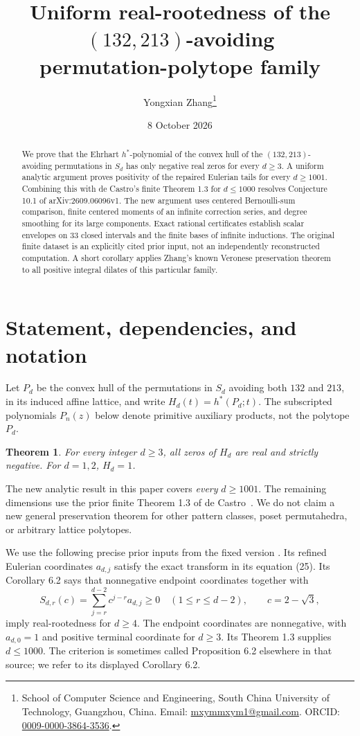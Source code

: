 \documentclass[11pt]{article}
\title{Uniform real-rootedness of the $(132,213)$-avoiding\\permutation-polytope family}
\author{Yongxian Zhang\thanks{School of Computer Science and Engineering,
South China University of Technology, Guangzhou, China.
Email: \href{mailto:mxymmxym1@gmail.com}{mxymmxym1@gmail.com}.
ORCID: \href{https://orcid.org/0009-0000-3864-3536}{0009-0000-3864-3536}.}}
\date{8 October 2026}
\newtheorem{theorem}{Theorem}[section]
\theoremstyle{remark}\newtheorem{remark}[theorem]{Remark}
\newcommand{\cc}{2-\sqrt3}
\begin{document}
\maketitle
\begin{abstract}
We prove that the Ehrhart $h^*$-polynomial of the convex hull of the
$(132,213)$-avoiding permutations in $S_d$ has only negative real zeros for
every $d\ge3$. A uniform analytic argument proves positivity of the repaired
Eulerian tails for every $d\ge1001$. Combining this with de Castro's finite
Theorem 1.3 for $d\le1000$ resolves Conjecture 10.1 of
arXiv:2609.06096v1. The new argument uses centered Bernoulli-sum comparison,
finite centered moments of an infinite correction series, and degree smoothing
for its large components. Exact rational certificates establish scalar
envelopes on 33 closed intervals and the finite bases of infinite inductions.
The original finite dataset is an explicitly cited prior input, not an
independently reconstructed computation. A short corollary applies Zhang's
known Veronese preservation theorem to all positive integral dilates of this
particular family.
\end{abstract}
\tableofcontents

\section{Statement, dependencies, and notation}\label{sec:inputs}
Let $P_d$ be the convex hull of the permutations in $S_d$ avoiding both
$132$ and $213$, in its induced affine lattice, and write
$H_d(t)=h^*(P_d;t)$. The subscripted polynomials $P_n(z)$ below denote
primitive auxiliary products, not the polytope $P_d$.
\begin{theorem}\label{thm:main}
For every integer $d\ge3$, all zeros of $H_d$ are real and strictly negative.
For $d=1,2$, $H_d=1$.
\end{theorem}
The new analytic result in this paper covers \emph{every} $d\ge1001$.
The remaining dimensions use the prior finite Theorem 1.3 of
de Castro~\cite{decastro}. We do not claim a new general preservation theorem
for other pattern classes, poset permutahedra, or arbitrary lattice polytopes.

We use the following precise prior inputs from the fixed version
\cite{decastro}. Its refined Eulerian coordinates $a_{d,j}$ satisfy the exact
transform in its equation (25). Its Corollary 6.2 says that nonnegative
endpoint coordinates together with
\begin{equation}\label{eq:tails}
 S_{d,r}(c)=\sum_{j=r}^{d-2}c^{j-r}a_{d,j}\ge0
 \quad(1\le r\le d-2),\qquad c=\cc,
\end{equation}
imply real-rootedness for $d\ge4$. The endpoint coordinates are nonnegative,
with $a_{d,0}=1$ and positive terminal coordinate for $d\ge3$.
Its Theorem 1.3 supplies $d\le1000$.
The criterion is sometimes called Proposition 6.2 elsewhere in that source;
we refer to its displayed Corollary 6.2.
\end{document}
